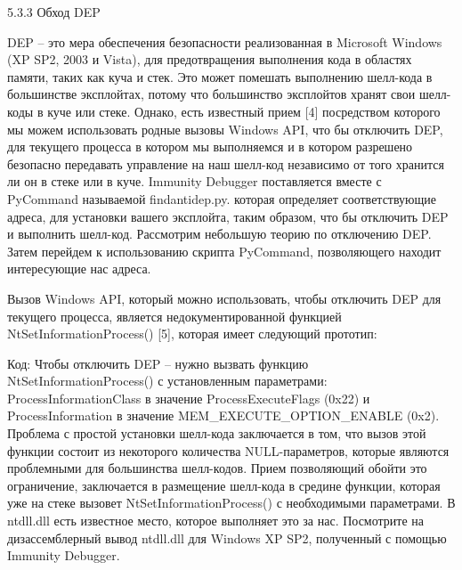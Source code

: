 \documentclass[12pt]{book}
\begin{document}
5.3.3 Обход DEP

DEP – это мера обеспечения безопасности реализованная в Microsoft Windows (XP SP2, 2003 и Vista), для предотвращения выполнения кода в областях памяти, таких как куча и стек. Это может помешать выполнению шелл-кода в большинстве эксплойтах, потому что большинство эксплойтов хранят свои шелл-коды в куче или стеке. Однако, есть известный прием [4] посредством которого мы можем использовать родные вызовы Windows API, что бы отключить DEP, для текущего процесса в котором мы выполняемся и в котором разрешено безопасно передавать управление на наш шелл-код независимо от того хранится ли он в стеке или в куче. Immunity Debugger поставляется вместе с PyCommand называемой findantidep.py. которая определяет соответствующие адреса, для установки вашего эксплойта, таким образом, что бы отключить DEP и выполнить шелл-код. Рассмотрим небольшую теорию по отключению DEP. Затем перейдем к использованию скрипта PyCommand, позволяющего находит интересующие нас адреса. 

Вызов Windows API, который можно использовать, чтобы отключить DEP для текущего процесса, является недокументированной функцией NtSetInformationProcess() [5], которая имеет следующий прототип:

Код:
Чтобы отключить DEP – нужно вызвать функцию NtSetInformationProcess() с установленным параметрами: ProcessInformationClass в значение ProcessExecuteFlags (0x22) и ProcessInformation в значение MEM\_EXECUTE\_OPTION\_ENABLE (0x2). Проблема с простой установки шелл-кода заключается в том, что вызов этой функции состоит из некоторого количества NULL-параметров, которые являются проблемными для большинства шелл-кодов. Прием позволяющий обойти это ограничение, заключается в размещение шелл-кода в средине функции, которая уже на стеке вызовет NtSetInformationProcess() с необходимыми параметрами. В ntdll.dll есть известное место, которое выполняет это за нас. Посмотрите на дизассемблерный вывод ntdll.dll для Windows XP SP2, полученный с помощью Immunity Debugger.
\end{document}
